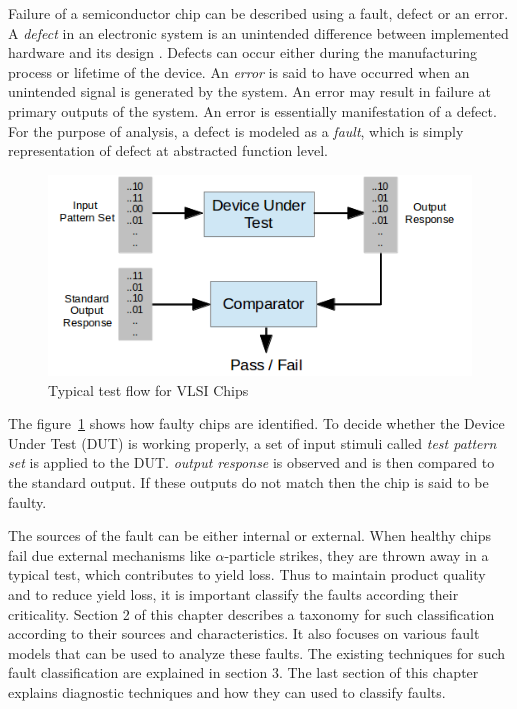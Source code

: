 Failure of a semiconductor chip can be described using a fault, defect or an error. A \emph{defect} in an electronic system is an unintended difference between implemented hardware and its design \cite{Agrawal2000}. Defects can occur either during the manufacturing process or lifetime of the device. An \emph{error} is said to have occurred when an unintended signal is generated by the system. An error may result in failure at primary outputs of the system. An error is essentially manifestation of a defect. For the purpose of analysis, a defect is modeled as a \emph{fault}, which is simply representation of defect at abstracted function level.

\begin{figure}[h]
  \begin{center}
    \captionsetup{justification=centering}
    \includegraphics[scale=0.75]{figures/vlsitesting.png}
    \caption{Typical test flow for VLSI Chips}
    \label{fig:vlsitesting}
  \end{center}
\end{figure}

The figure~\ref{fig:vlsitesting} shows how faulty chips are identified. To decide whether the Device Under Test (DUT) is working properly, a set of input stimuli called \emph{test pattern set} is applied to the DUT. \emph{output response} is observed and is then compared to the standard output. If these outputs do not match then the chip is said to be faulty.

The sources of the fault can be either internal or external. When healthy chips fail due external mechanisms like $\alpha$-particle strikes, they are thrown away in a typical test, which contributes to yield loss. Thus to maintain product quality and to reduce yield loss, it is important classify the faults according their criticality. Section 2 of this chapter describes a taxonomy for such classification according to their sources and characteristics. It also focuses on various fault models that can be used to analyze these faults. The existing techniques for such fault classification are explained in section 3. The last section of this chapter explains diagnostic techniques and how they can used to classify faults.

